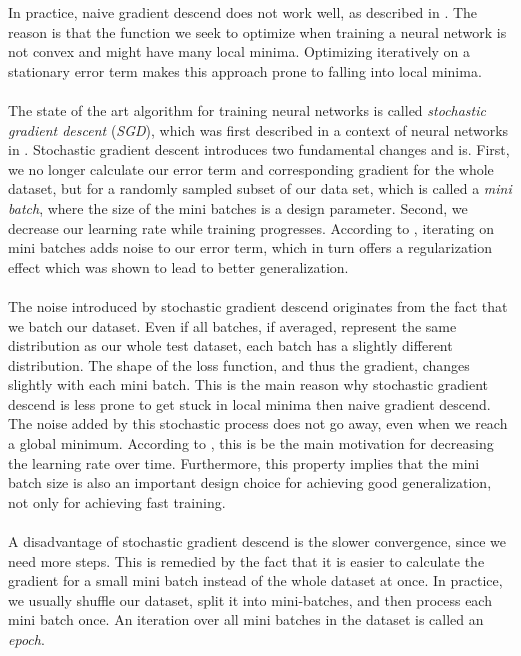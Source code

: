In practice, naive gradient descend does not work well, as described in \cite{wilson2003general}. The reason is that the function we seek to optimize when training a neural network is not convex and might have many local minima. Optimizing iteratively on a stationary error term makes this approach prone to falling into local minima. \\ \\
The state of the art algorithm for training neural networks is called \textit{stochastic gradient descent} (\textit{SGD}), which was first described in a context of neural networks in \cite{bottou1991stochastic}. Stochastic gradient descent introduces two fundamental changes and is. First, we no longer calculate our error term and corresponding gradient for the whole dataset, but for a randomly sampled subset of our data set, which is called a \textit{mini batch}, where the size of the mini batches is a design parameter. Second, we decrease our learning rate while training progresses. According to \cite{Goodfellow-et-al-2016}, iterating on mini batches adds noise to our error term, which in turn offers a regularization effect which was shown to lead to better generalization.
\\ \\
The noise introduced by stochastic gradient descend originates from the fact that we batch our dataset. Even if all batches, if averaged, represent the same distribution as our whole test dataset, each batch has a slightly different distribution. The shape of the loss function, and thus the gradient, changes slightly with each mini batch. This is the main reason why stochastic gradient descend is less prone to get stuck in local minima then naive gradient descend. The noise added by this stochastic process does not go away, even when we reach a global minimum. According to \cite{Goodfellow-et-al-2016}, this is be the main motivation for decreasing the learning rate over time. Furthermore, this property implies that the mini batch size is also an important design choice for achieving good generalization, not only for achieving fast training. 
\\ \\
A disadvantage of stochastic gradient descend is the slower convergence, since we need more steps. This is remedied by the fact that it is easier to calculate the gradient for a small mini batch instead of the whole dataset at once. In practice, we usually shuffle our dataset, split it into mini-batches, and then process each mini batch once. An iteration over all mini batches in the dataset is called an \textit{epoch}. 

